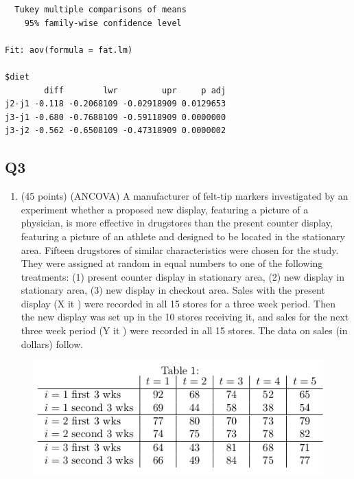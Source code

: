 \documentclass[11pt]{article}
\makeatletter
\def\maxwidth{\ifdim\Gin@nat@width>\linewidth\linewidth
    \else\Gin@nat@width\fi}
\let\Oldincludegraphics\includegraphics
\renewcommand{\includegraphics}[1]{\Oldincludegraphics[width=.8\maxwidth]{#1}}
\providecommand{\tightlist}{%
      \setlength{\itemsep}{0pt}\setlength{\parskip}{0pt}}
\makeatother
\begin{document}
    
    \begin{verbatim}
  Tukey multiple comparisons of means
    95% family-wise confidence level

Fit: aov(formula = fat.lm)

$diet
        diff        lwr         upr     p adj
j2-j1 -0.118 -0.2068109 -0.02918909 0.0129653
j3-j1 -0.680 -0.7688109 -0.59118909 0.0000000
j3-j2 -0.562 -0.6508109 -0.47318909 0.0000002

    \end{verbatim}

    
    \subsection*{Q3}\label{q3}

\begin{enumerate}
\def\labelenumi{\arabic{enumi}.}
\setcounter{enumi}{2}
\tightlist
\item
  (45 points) (ANCOVA) A manufacturer of felt-tip markers investigated
  by an experiment whether a proposed new display, featuring a picture
  of a physician, is more effective in drugstores than the present
  counter display, featuring a picture of an athlete and designed to be
  located in the stationary area. Fifteen drugstores of similar
  characteristics were chosen for the study. They were assigned at
  random in equal numbers to one of the following treatments: (1)
  present counter display in stationary area, (2) new display in
  stationary area, (3) new display in checkout area. Sales with the
  present display (X it ) were recorded in all 15 stores for a three
  week period. Then the new display was set up in the 10 stores
  receiving it, and sales for the next three week period (Y it ) were
  recorded in all 15 stores. The data on sales (in dollars) follow.
\end{enumerate}

\begin{figure}[H]
\centering
\includegraphics{2.png}
\caption{}
\end{figure}
\end{document}
